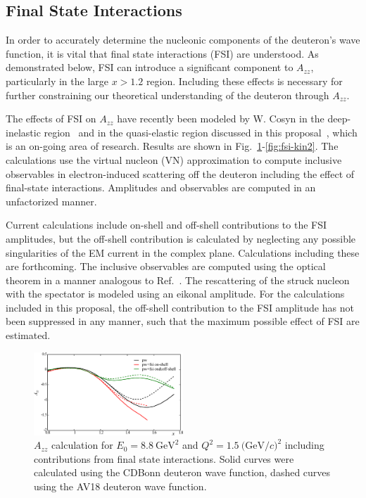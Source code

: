 
\subsection{Final State Interactions}

In order to accurately determine the nucleonic components of the deuteron's wave function, it is vital that final state interactions (FSI) are understood. As demonstrated below, FSI can introduce a significant component to $A_{zz}$, particularly in the large $x>1.2$ region. Including these effects is necessary for further constraining our theoretical understanding of the deuteron through $A_{zz}$.

The effects of FSI on $A_{zz}$ have recently been modeled by W. Cosyn in the deep-inelastic region~\cite{Cosyn:2014sqa} and in the quasi-elastic region discussed in this proposal~\cite{cosyn-convo}, which is an on-going area of research. Results are shown in Fig.~\ref{fig:fsi-kin1}-\ref{fig:fsi-kin2}. The calculations use the virtual nucleon (VN) approximation to compute inclusive observables in electron-induced scattering off the deuteron including the 
effect of final-state interactions. Amplitudes and observables are computed in an unfactorized manner.   

Current calculations include on-shell and off-shell contributions to the FSI amplitudes, but the off-shell contribution is calculated by neglecting any  possible singularities of the EM current in the complex plane.  Calculations 
including these are forthcoming.  The inclusive observables are computed using 
the optical theorem in a manner analogous to Ref.~\cite{Cosyn:2013uoa}.  The 
rescattering of the struck nucleon with the spectator is modeled using an 
eikonal amplitude.  For the calculations included in this proposal, the off-shell 
contribution to the FSI amplitude has not been suppressed in any manner, such that the maximum possible effect of FSI are estimated.

\begin{figure}[htb]
\begin{center}
  \includegraphics[width=0.5\textwidth]{figs/kin1_cdbonn_av18.eps}
\caption{$A_{zz}$ calculation for $E_0=8.8\mathrm{~GeV}^2$ and $Q^2=1.5\mathrm{~(GeV/}c)^2$ including contributions from final state interactions.  
Solid curves were calculated using the CDBonn deuteron wave function, dashed curves using the AV18 
deuteron wave function.}
\label{fig:fsi-kin1}       %
\end{center}
\end{figure}

